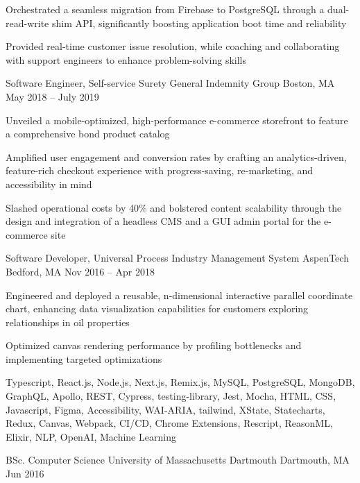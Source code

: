 \documentclass[]{awesome-cv}
\begin{document}
\begin{cventries}
{\begin{cvitems}
		\item {Orchestrated a seamless migration from Firebase to PostgreSQL through a dual-read-write shim API, significantly boosting application boot time and reliability}
		\item {Provided real-time customer issue resolution, while coaching and collaborating with support engineers to enhance problem-solving skills}
		\end{cvitems}}
	\cventry
	{Software Engineer, Self-service Surety}
	{General Indemnity Group}
	{Boston, MA}
	{May 2018 – July 2019}
	{\begin{cvitems}
		\item {Unveiled a mobile-optimized, high-performance e-commerce storefront to feature a comprehensive bond product catalog}
		\item {Amplified user engagement and conversion rates by crafting an analytics-driven, feature-rich checkout experience with progress-saving, re-marketing, and accessibility in mind}
		\item {Slashed operational costs by 40\% and bolstered content scalability through the design and integration of a headless CMS and a GUI admin portal for the e-commerce site}
		\end{cvitems}}
	\cventry
	{Software Developer, Universal Process Industry Management System} 
	{AspenTech}
	{Bedford, MA}
	{Nov 2016 – Apr 2018}
	{\begin{cvitems}
		\item {Engineered and deployed a reusable, n-dimensional interactive parallel coordinate chart, enhancing data visualization capabilities for customers exploring relationships in oil properties}
		\item {Optimized canvas rendering performance by profiling bottlenecks and implementing targeted optimizations}
		\end{cvitems}}
\end{cventries}

\vspace{-2mm}

Typescript, React.js, Node.js, Next.js, Remix.js, MySQL, PostgreSQL, MongoDB, GraphQL, Apollo, REST, Cypress, testing-library, Jest, Mocha, HTML, CSS, Javascript, Figma, Accessibility, WAI-ARIA, tailwind, XState, Statecharts, Redux, Canvas, Webpack, CI/CD, Chrome Extensions, Rescript, ReasonML, Elixir, NLP, OpenAI, Machine Learning

\begin{cvhonors}
	\cvhonor
	{BSc. Computer Science}
	{University of Massachusetts Dartmouth}
	{Dartmouth, MA}
	{Jun 2016}
\end{cvhonors}
\end{document}
